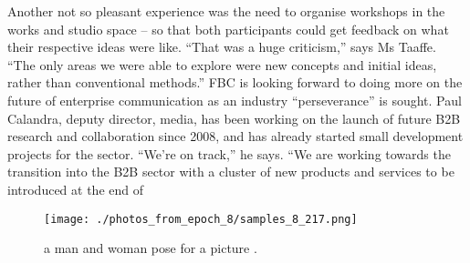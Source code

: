 \documentclass{article}%
\begin{document}
Another not so pleasant experience was the need to organise workshops in the works and studio space – so that both participants could get feedback on what their respective ideas were like.\newline%
“That was a huge criticism,” says Ms Taaffe. “The only areas we were able to explore were new concepts and initial ideas, rather than conventional methods.”\newline%
FBC is looking forward to doing more on the future of enterprise communication as an industry “perseverance” is sought.\newline%
Paul Calandra, deputy director, media, has been working on the launch of future B2B research and collaboration since 2008, and has already started small development projects for the sector.\newline%
“We’re on track,” he says. “We are working towards the transition into the B2B sector with a cluster of new products and services to be introduced at the end of

%


\begin{figure}[h!]%
\centering%
\texttt{[image: ./photos\_from\_epoch\_8/samples\_8\_217.png]}%
\caption{a man and woman pose for a picture .}%
\end{figure}

%
\end{document}
